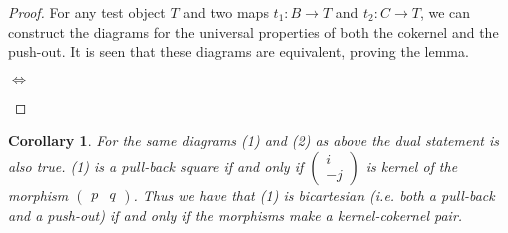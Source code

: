 \documentclass[11pt]{article}
\newtheorem{corollary}{Corollary}[theorem]
\theoremstyle{definition}
\theoremstyle{remark}
\begin{document}
            \begin{proof}
                For any test object $T$ and two maps $t_1:B\rightarrow T$ and $t_2:C\rightarrow T$, we can construct the diagrams for the universal properties of both the cokernel and the push-out. It is seen that these diagrams are equivalent, proving the lemma.
                \begin{center}
                    $\Leftrightarrow$
                \end{center}
            \end{proof}

            \begin{corollary}
                For the same diagrams (1) and (2) as above the dual statement is also true. (1) is a pull-back square if and only if $\begin{pmatrix}
                    i \\ -j
                \end{pmatrix}$ is kernel of the morphism $\begin{pmatrix}
                    p & q
                \end{pmatrix}$. Thus we have that (1) is bicartesian (i.e. both a pull-back and a push-out) if and only if the morphisms make a kernel-cokernel pair.
            \end{corollary}
\end{document}

